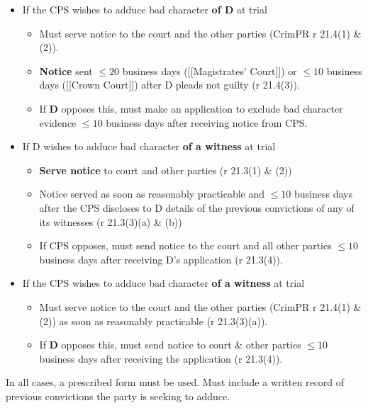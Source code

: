 \documentclass[
]{article}
\providecommand{\tightlist}{%
  \setlength{\itemsep}{0pt}\setlength{\parskip}{0pt}}
\begin{document}
\begin{itemize}
\tightlist
\item
  If the CPS wishes to adduce bad character \textbf{of D} at trial

  \begin{itemize}
  \tightlist
  \item
    Must serve notice to the court and the other parties (CrimPR r
    21.4(1) \& (2)).
  \item
    \textbf{Notice} sent \(\leq 20\) business days ({[}{[}Magistrates'
    Court{]}{]}) or \(\leq 10\) business days ({[}{[}Crown Court{]}{]})
    after D pleads not guilty (r 21.4(3)).
  \item
    If \textbf{D} opposes this, must make an application to exclude bad
    character evidence \(\leq 10\) business days after receiving notice
    from CPS.
  \end{itemize}
\item
  If D wishes to adduce bad character \textbf{of a witness} at trial

  \begin{itemize}
  \tightlist
  \item
    \textbf{Serve notice} to court and other parties (r 21.3(1) \& (2))
  \item
    Notice served as soon as reasonably practicable and \(\leq 10\)
    business days after the CPS discloses to D details of the previous
    convictions of any of its witnesses (r 21.3(3)(a) \& (b))
  \item
    If CPS opposes, must send notice to the court and all other parties
    \(\leq 10\) business days after receiving D's application (r
    21.3(4)).\\
  \end{itemize}
\item
  If the CPS wishes to adduce bad character \textbf{of a witness} at
  trial

  \begin{itemize}
  \tightlist
  \item
    Must serve notice to the court and the other parties (CrimPR r
    21.4(1) \& (2)) as soon as reasonably practicable (r 21.3(3)(a)).
  \item
    If \textbf{D} opposes this, must send notice to court \& other
    parties \(\leq 10\) business days after receiving the application (r
    21.3(4)).
  \end{itemize}
\end{itemize}

In all cases, a prescribed form must be used. Must include a written
record of previous convictions the party is seeking to adduce.
\end{document}
